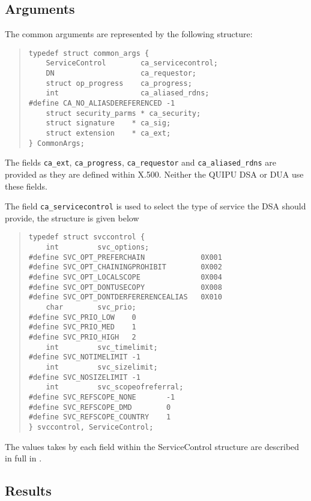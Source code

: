\subsection {Arguments}
\label{common_args}

The common arguments are represented by the following structure:
\begin{quote}\small\begin{verbatim}
typedef struct common_args {
    ServiceControl        ca_servicecontrol;
    DN                    ca_requestor;
    struct op_progress    ca_progress;
    int                   ca_aliased_rdns;
#define CA_NO_ALIASDEREFERENCED -1
    struct security_parms * ca_security;
    struct signature    * ca_sig;
    struct extension    * ca_ext;
} CommonArgs;
\end{verbatim}\end{quote}

The fields \verb"ca_ext", \verb"ca_progress", \verb"ca_requestor" 
and \verb"ca_aliased_rdns" are provided as
they are defined within X.500.  Neither the QUIPU DSA or DUA use these fields.

The field \verb"ca_servicecontrol" is used to select the type of service
the DSA should provide, the structure is given below

\begin{quote}\small\begin{verbatim}
typedef struct svccontrol {    
    int         svc_options;
#define SVC_OPT_PREFERCHAIN             0X001
#define SVC_OPT_CHAININGPROHIBIT        0X002
#define SVC_OPT_LOCALSCOPE              0X004
#define SVC_OPT_DONTUSECOPY             0X008
#define SVC_OPT_DONTDERFERERENCEALIAS   0X010
    char        svc_prio;
#define SVC_PRIO_LOW    0
#define SVC_PRIO_MED    1
#define SVC_PRIO_HIGH   2
    int         svc_timelimit; 
#define SVC_NOTIMELIMIT -1
    int         svc_sizelimit;
#define SVC_NOSIZELIMIT -1
    int         svc_scopeofreferral;
#define SVC_REFSCOPE_NONE       -1
#define SVC_REFSCOPE_DMD        0
#define SVC_REFSCOPE_COUNTRY    1
} svccontrol, ServiceControl;
\end{verbatim}\end{quote}

The values takes by each field within the ServiceControl
structure are described in full
in \cite{CCITT.Directory}.

\subsection {Results}
\label{common_results}


